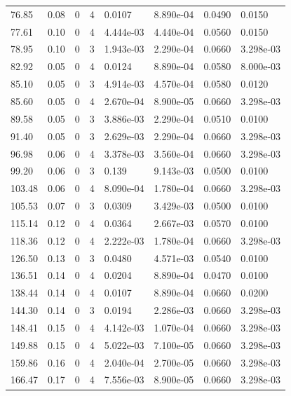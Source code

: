 \documentclass[preview]{standalone}
\begin{document}
{{\begin{tabular}{L{1.2cm}C{1.2cm} C{0.3cm}C{0.5cm} C{1.4cm}C{1.4cm} C{1.4cm}C{1.4cm}}
  76.85  &  0.08  & 0     &  4 &  0.0107  & 8.890e-04  & 0.0490 &  0.0150   \\ 
  77.61  &  0.10  & 0     &  4 &  4.444e-03  & 4.440e-04  & 0.0560 &  0.0150   \\ 
  78.95  &  0.10  & 0     &  3 &  1.943e-03  & 2.290e-04  & 0.0660 &  3.298e-03   \\ 
  82.92  &  0.05  & 0     &  4 &  0.0124  & 8.890e-04  & 0.0580 &  8.000e-03   \\ 
  85.10  &  0.05  & 0     &  3 &  4.914e-03  & 4.570e-04  & 0.0580 &  0.0120   \\ 
  85.60  &  0.05  & 0     &  4 &  2.670e-04  & 8.900e-05  & 0.0660 &  3.298e-03   \\ 
  89.58  &  0.05  & 0     &  3 &  3.886e-03  & 2.290e-04  & 0.0510 &  0.0100   \\ 
  91.40  &  0.05  & 0     &  3 &  2.629e-03  & 2.290e-04  & 0.0660 &  3.298e-03   \\ 
  96.98  &  0.06  & 0     &  4 &  3.378e-03  & 3.560e-04  & 0.0660 &  3.298e-03   \\ 
  99.20  &  0.06  & 0     &  3 &  0.139  & 9.143e-03  & 0.0500 &  0.0100   \\ 
  103.48  &  0.06  & 0     &  4 &  8.090e-04  & 1.780e-04  & 0.0660 &  3.298e-03   \\ 
  105.53  &  0.07  & 0     &  3 &  0.0309  & 3.429e-03  & 0.0500 &  0.0100   \\ 
  115.14  &  0.12  & 0     &  4 &  0.0364  & 2.667e-03  & 0.0570 &  0.0100   \\ 
  118.36  &  0.12  & 0     &  4 &  2.222e-03  & 1.780e-04  & 0.0660 &  3.298e-03   \\ 
  126.50  &  0.13  & 0     &  3 &  0.0480  & 4.571e-03  & 0.0540 &  0.0100   \\ 
  136.51  &  0.14  & 0     &  4 &  0.0204  & 8.890e-04  & 0.0470 &  0.0100   \\ 
  138.44  &  0.14  & 0     &  4 &  0.0107  & 8.890e-04  & 0.0660 &  0.0200   \\ 
  144.30  &  0.14  & 0     &  3 &  0.0194  & 2.286e-03  & 0.0660 &  3.298e-03   \\ 
  148.41  &  0.15  & 0     &  4 &  4.142e-03  & 1.070e-04  & 0.0660 &  3.298e-03   \\ 
  149.88  &  0.15  & 0     &  4 &  5.022e-03  & 7.100e-05  & 0.0660 &  3.298e-03   \\ 
  159.86  &  0.16  & 0     &  4 &  2.040e-04  & 2.700e-05  & 0.0660 &  3.298e-03   \\ 
  166.47  &  0.17  & 0     &  4 &  7.556e-03  & 8.900e-05  & 0.0660 &  3.298e-03   \\ 

\end{tabular}}}
\end{document}
